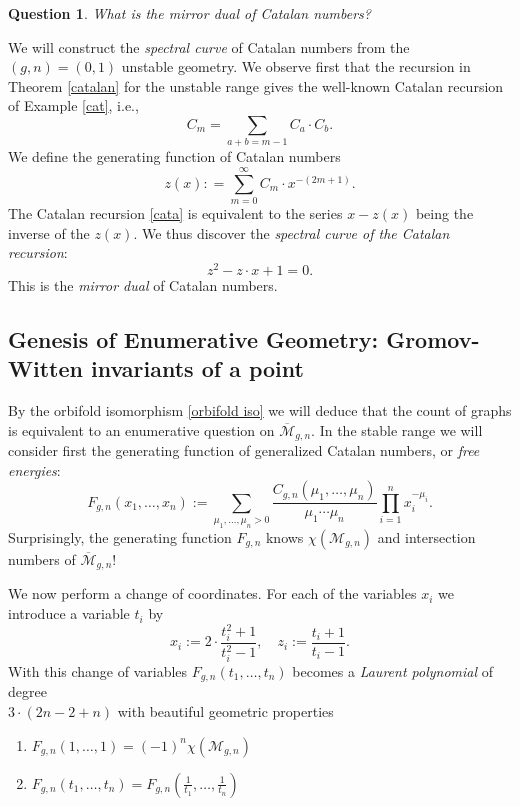 \documentclass[oneside, 11pt]{amsart}
\newtheorem{quest}[thm]{Question}
\theoremstyle{definition}
\numberwithin{equation}{subsection}
\newcommand{\be}{\begin{equation}}
\newcommand{\ee}{\end{equation}}
\newcommand{\Mbar}{{\overline{\mathcal{M}}}}
\newcommand{\cM}{{\mathcal{M}}}
\begin{document}
\begin{quest}
What is the mirror dual of Catalan numbers?
\end{quest}

We will construct the \emph{spectral curve} of Catalan numbers from the $(g,n)=(0,1)$ unstable geometry. We observe first that the recursion in Theorem \ref{catalan} for the unstable range gives the well-known Catalan recursion of Example \ref{cat}, i.e., 
\be \label{cata}
C_m=\sum_{a+b=m-1}C_a \cdot C_b.
\ee
We define the generating function of Catalan numbers 
$$z(x): = \sum_{m=0}^\infty C_m \cdot x^{-(2m+1)}.$$
The Catalan recursion \eqref{cata} is equivalent to the series $x-z(x)$ being the inverse of the $z(x)$. 
We thus discover the \textit{spectral curve of the Catalan recursion}:
\be\label{spec cata} 
 z^2-z \cdot x+1 = 0.
\ee
\noindent
This is the \textit{mirror dual} of Catalan numbers.


\subsection{Genesis of Enumerative Geometry: Gromov-Witten invariants of a point}\label{GWP}
By the orbifold isomorphism \eqref{orbifold iso} we will deduce that the count of graphs is equivalent to an enumerative question on $\Mbar_{g,n}$. In the stable range we will consider first the generating function of generalized Catalan numbers, or \emph{free energies}:
$$F_{g,n}(x_1,\dots,x_n):=
\sum_{\mu_1,\dots,\mu_n>0}
\frac{C_{g,n}(\mu_1,\dots,\mu_n)}
{\mu_1\cdots\mu_n}
\prod_{i=1}^n x_i^{-\mu_i}.$$
Surprisingly, the generating function $F_{g,n}$ knows $\chi(\cM_{g,n})$ and intersection numbers of $\Mbar_{g,n}$!

We  now perform a change of coordinates. For each of the variables $x_i$ we  introduce a variable $t_i$ by 
\be \label{variable}
x_i:=2 \cdot \frac{t_i^2+1}{t_i^2-1 }, \quad
z_i:=\frac{t_i+1}{t_i-1}.
\ee
With this change of variables $F_{g,n}(t_1,\ldots,t_n)$ becomes a \textit{Laurent polynomial} of degree\\
$3\cdot (2n-2+n)$ with beautiful geometric properties

\begin{enumerate}
\item $F_{g,n}(1,\ldots,1)=(-1)^n\chi(\cM_{g,n})$
\item $F_{g,n}(t_1,\ldots,t_n)=F_{g,n}(\frac{1}{t_1},\ldots,\frac{1}{t_n})$
\end{enumerate}
\end{document}
